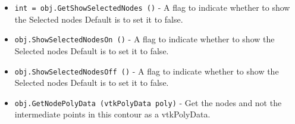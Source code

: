 \begin{itemize}
\item  \verb|int = obj.GetShowSelectedNodes ()| -  A flag to indicate whether to show the Selected nodes
 Default is to set it to false.

\item  \verb|obj.ShowSelectedNodesOn ()| -  A flag to indicate whether to show the Selected nodes
 Default is to set it to false.

\item  \verb|obj.ShowSelectedNodesOff ()| -  A flag to indicate whether to show the Selected nodes
 Default is to set it to false.

\item  \verb|obj.GetNodePolyData (vtkPolyData poly)| -  Get the nodes and not the intermediate points in this 
 contour as a vtkPolyData.

\end{itemize}
